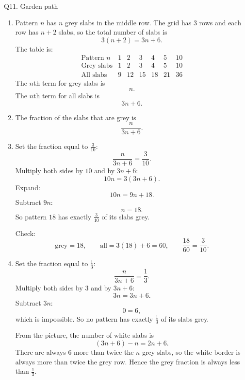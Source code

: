 \documentclass[11pt,a4paper]{article}
\begin{document}
\begin{solbox}{Q11. Garden path}
\begin{enumerate}[label=(\alph*)]
\item Pattern \(n\) has \(n\) grey slabs in the middle row. The grid has \(3\) rows and each row has \(n+2\) slabs, so the total number of slabs is
\[
3(n+2)=3n+6.
\]
The table is:
\[
\begin{array}{c|cccccc}
\text{Pattern }n & 1&2&3&4&5&10\\ \hline
\text{Grey slabs} & 1&2&3&4&5&10\\
\text{All slabs} & 9&12&15&18&21&36
\end{array}
\]
The \(n\)th term for grey slabs is
\[
\boxed{n}.
\]
The \(n\)th term for all slabs is
\[
\boxed{3n+6}.
\]

\item The fraction of the slabs that are grey is
\[
\boxed{\frac{n}{3n+6}}.
\]

\item Set the fraction equal to \(\frac{3}{10}\):
\[
\frac{n}{3n+6}=\frac{3}{10}.
\]
Multiply both sides by \(10\) and by \(3n+6\):
\[
10n=3(3n+6).
\]
Expand:
\[
10n=9n+18.
\]
Subtract \(9n\):
\[
n=18.
\]
So pattern \(\boxed{18}\) has exactly \(\frac{3}{10}\) of its slabs grey.

Check:
\[
\text{grey}=18,\qquad \text{all}=3(18)+6=60,\qquad \frac{18}{60}=\frac{3}{10}.
\]

\item Set the fraction equal to \(\frac{1}{3}\):
\[
\frac{n}{3n+6}=\frac{1}{3}.
\]
Multiply both sides by \(3\) and by \(3n+6\):
\[
3n=3n+6.
\]
Subtract \(3n\):
\[
0=6,
\]
which is impossible. So no pattern has exactly \(\frac{1}{3}\) of its slabs grey.

From the picture, the number of white slabs is
\[
(3n+6)-n=2n+6.
\]
There are always \(6\) more than twice the \(n\) grey slabs, so the white border is always more than twice the grey row. Hence the grey fraction is always less than \(\frac13\).
\end{enumerate}
\end{solbox}
\end{document}
